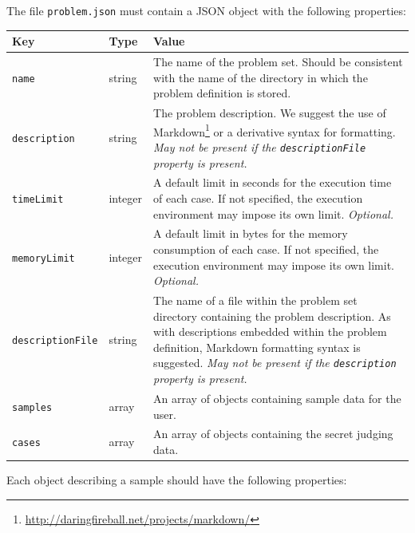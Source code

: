 \documentclass[11pt,letterpaper]{article}
\begin{document}
The file \texttt{problem.json} must contain a JSON object with the following
properties:

\nopagebreak
\begin{tabulary}{\textwidth}{ | l | l | L | }
    \hline
    \textbf{Key} & \textbf{Type} & \textbf{Value} \\
    \hline
    \texttt{name} & string & The name of the problem set. Should be consistent
        with the name of the directory in which the problem definition is
        stored. \\
    \hline
    \texttt{description} & string & The problem description. We suggest the use
        of
        Markdown\footnote{\url{http://daringfireball.net/projects/markdown/}}
        or a derivative syntax for formatting.
        \newline
        \emph{May not be present if the \texttt{descriptionFile} property is
        present.} \\
    \hline
    \texttt{timeLimit} & integer & A default limit in seconds for the execution
        time of each case. If not specified, the execution environment may
        impose its own limit. \emph{Optional.} \\
    \hline
    \texttt{memoryLimit} & integer & A default limit in bytes for the memory
        consumption of each case. If not specified, the execution environment
        may impose its own limit. \emph{Optional.} \\
    \hline
    \texttt{descriptionFile} & string & The name of a file within the problem
        set directory containing the problem description. As with descriptions
        embedded within the problem definition, Markdown formatting syntax is
        suggested.
        \newline
        \emph{May not be present if the \texttt{description} property is
        present.} \\
    \hline
    \texttt{samples} & array & An array of objects containing sample data for
        the user. \\
    \hline
    \texttt{cases} & array & An array of objects containing the secret judging
        data. \\
    \hline
\end{tabulary}

Each object describing a sample should have the following properties:
\end{document}
